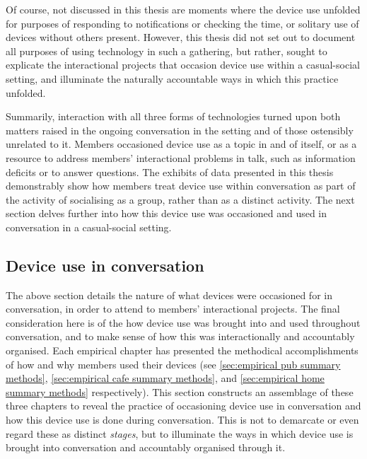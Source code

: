 \begin{revisedsubmission}
Of course, not discussed in this thesis are moments where the device use unfolded for purposes of responding to notifications or checking the time, or solitary use of devices without others present.
However, this thesis did not set out to document all purposes of using technology in such a gathering, but rather, sought to explicate the interactional projects that occasion device use within a casual-social setting, and illuminate the naturally accountable ways in which this practice unfolded.

Summarily, interaction with all three forms of technologies turned upon both matters raised in the ongoing conversation in the setting and of those ostensibly unrelated to it.
Members occasioned device use as a topic in and of itself, or as a resource to address members' interactional problems in talk, such as information deficits or to answer questions.
The exhibits of data presented in this thesis demonstrably show how members treat device use within conversation as part of the activity of socialising as a group, rather than as a distinct activity.
The next section delves further into how this device use was occasioned and used in conversation in a casual-social setting.
\end{revisedsubmission}






\subsection{Device use in conversation}\label{sec:synopsis discussion conduct device-use}
\begin{revisedsubmission}
The above section details the nature of what devices were occasioned for in conversation, in order to attend to members' interactional projects.
The final consideration here is of the how device use was brought into and used throughout conversation, and to make sense of how this was interactionally and accountably organised.
Each empirical chapter has presented the methodical accomplishments of how and why members used their devices (see \ref{sec:empirical pub summary methods}, \ref{sec:empirical cafe summary methods}, and \ref{sec:empirical home summary methods} respectively).
This section constructs an assemblage of these three chapters to reveal the practice of occasioning device use in conversation and how this device use is done during conversation.
This is not to demarcate or even regard these as distinct \textit{stages}, but to illuminate the ways in which device use is brought into conversation and accountably organised through it.
\end{revisedsubmission}




